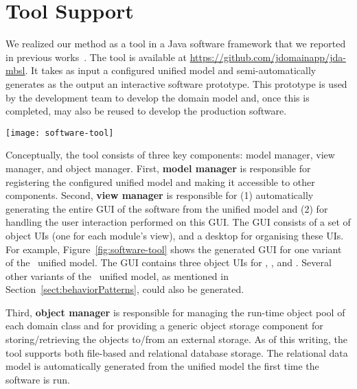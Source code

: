 \section{Tool Support}
\label{sect:tool} %

We realized our method as a tool in a Java software framework that we reported in previous works~\cite{le_domain_2018, le_jdomainapp_2017}. The tool is available at \url{https://github.com/jdomainapp/jda-mbsl}. It takes as input a configured unified model and semi-automatically generates as the output an interactive software prototype. This prototype is used by the development team to develop the domain model and, once this is completed, may also be reused to develop the production software.

\begin{figure*}[ht]
	\centering
	\texttt{[image: software-tool]}
	\caption{The GUI of \courseman~software generated by the tool: (1) desktop, 
		(2-4) the object UIs of , , and .} %
	\label{fig:software-tool}
\end{figure*}

Conceptually, the tool consists of three key components: model manager, view manager, and object manager. First, \textbf{model manager} is responsible for registering the configured unified model and making it accessible to other components. 
Second, \textbf{view manager} is responsible for (1) automatically generating the entire GUI of the software from the unified model and (2) for handling the user interaction performed on this GUI. The GUI consists of a set of object UIs (one for each module's view), and a desktop for organising these UIs. For example, Figure~\ref{fig:software-tool} shows the generated GUI for one variant of the \courseman~unified model. The GUI contains three object UIs for , , and .
Several other variants of the \courseman~unified model, as mentioned in Section~\ref{sect:behaviorPatterns}, could also be generated. 

Third, \textbf{object manager} is responsible for managing the run-time object pool of each domain class and for providing a generic object storage component for storing/retrieving the objects to/from an external storage. As of this writing, the tool supports both file-based and relational database storage. The relational data model is automatically generated from the unified model the first time the software is run.
